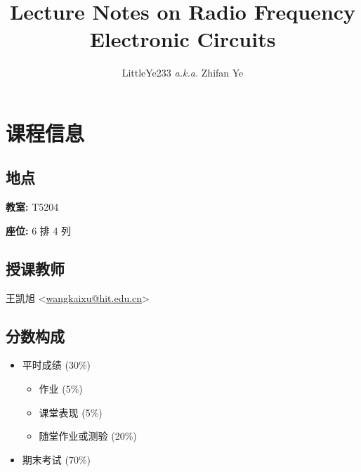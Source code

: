 \documentclass{notes}
\title{Lecture Notes on Radio Frequency Electronic Circuits}
\author{LittleYe233 \textit{a.k.a.} Zhifan Ye}
\begin{document}
\maketitle
\tableofcontents
\newpage

\section*{课程信息}

\subsection{地点}
\textbf{教室:} T5204 \par
\textbf{座位:} 6 排 4 列

\subsection{授课教师}
王凯旭 <\href{mailto:wangkaixu@hit.edu.cn}{wangkaixu@hit.edu.cn}>

\subsection{分数构成}
\begin{itemize}
    \item 平时成绩 (30\%)
    \begin{itemize}
        \item 作业 (5\%)
        \item 课堂表现 (5\%)
        \item 随堂作业或测验 (20\%)
    \end{itemize}
    \item 期末考试 (70\%)
\end{itemize}
\end{document}
